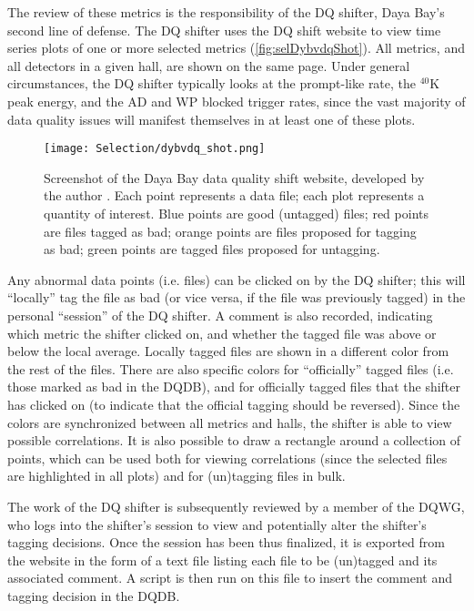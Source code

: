 \documentclass[../thesis.tex]{subfiles}
\begin{document}
The review of these metrics is the responsibility of the DQ shifter, Daya Bay's second line of defense. The DQ shifter uses the DQ shift website to view time series plots of one or more selected metrics (\autoref{fig:selDybvdqShot}). All metrics, and all detectors in a given hall, are shown on the same page. Under general circumstances, the DQ shifter typically looks at the prompt-like rate, the $^{40}$K peak energy, and the AD and WP blocked trigger rates, since the vast majority of data quality issues will manifest themselves in at least one of these plots.

\begin{figure}[h!]
  \texttt{[image: Selection/dybvdq\_shot.png]}
  \caption[Screenshot of Daya Bay data quality website.]{Screenshot of the Daya Bay data quality shift website, developed by the author \cite{dybvdq}. Each point represents a data file; each plot represents a quantity of interest. Blue points are good (untagged) files; red points are files tagged as bad; orange points are files proposed for tagging as bad; green points are tagged files proposed for untagging.}
  \label{fig:selDybvdqShot}
\end{figure}

Any abnormal data points (i.e. files) can be clicked on by the DQ shifter; this will ``locally'' tag the file as bad (or vice versa, if the file was previously tagged) in the personal ``session'' of the DQ shifter. A comment is also recorded, indicating which metric the shifter clicked on, and whether the tagged file was above or below the local average. Locally tagged files are shown in a different color from the rest of the files. There are also specific colors for ``officially'' tagged files (i.e. those marked as bad in the DQDB), and for officially tagged files that the shifter has clicked on (to indicate that the official tagging should be reversed). Since the colors are synchronized between all metrics and halls, the shifter is able to view possible correlations. It is also possible to draw a rectangle around a collection of points, which can be used both for viewing correlations (since the selected files are highlighted in all plots) and for (un)tagging files in bulk. 

The work of the DQ shifter is subsequently reviewed by a member of the DQWG, who logs into the shifter's session to view and potentially alter the shifter's tagging decisions. Once the session has been thus finalized, it is exported from the website in the form of a text file listing each file to be (un)tagged and its associated comment. A script is then run on this file to insert the comment and tagging decision in the DQDB.
\end{document}
